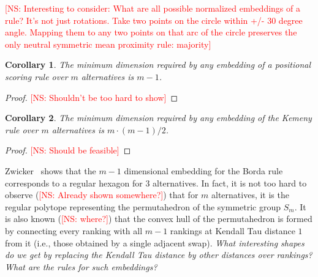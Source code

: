 \documentclass[10pt,letterpaper]{article}
\newcommand{\calL}{{\mathcal{L}}}
\newcommand{\rank}{{\calL(A)}}
\newtheorem{corollary}{Corollary}
\newcommand{\kibitz}[2]{\ifnum\Comments=1\textcolor{#1}{#2}\fi}
\newcommand{\cns}[1]{\kibitz{red} {[NS: #1]}}
\begin{document}
\cns{Interesting to consider: What are all possible normalized embeddings of a rule? It's not just rotations. Take two points on the circle within +/- 30 degree angle. Mapping them to any two points on that arc of the circle preserves the only neutral symmetric mean proximity rule: majority}

\begin{corollary}
The minimum dimension required by any embedding of a positional scoring rule over $m$ alternatives is $m-1$.
\end{corollary}
\begin{proof}
\cns{Shouldn't be too hard to show}
\end{proof}
%

\begin{corollary}
The minimum dimension required by any embedding of the Kemeny rule over $m$ alternatives is $m\cdot(m-1)/2$.
\end{corollary}
\begin{proof}
\cns{Should be feasible}
\end{proof}

Zwicker~\cite{Zwicker08a} shows that the $m-1$ dimensional embedding for the Borda rule corresponds to a regular hexagon for $3$ alternatives. In fact, it is not too hard to observe (\cns{Already shown somewhere?}) that for $m$ alternatives, it is the regular polytope representing the permutahedron of the symmetric group $S_m$. It is also known (\cns{where?}) that the convex hull of the permutahedron is formed by connecting every ranking with all $m-1$ rankings at Kendall Tau distance $1$ from it (i.e., those obtained by a single adjacent swap). \emph{What interesting shapes do we get by replacing the Kendall Tau distance by other distances over rankings? What are the rules for such embeddings?}
\end{document}

